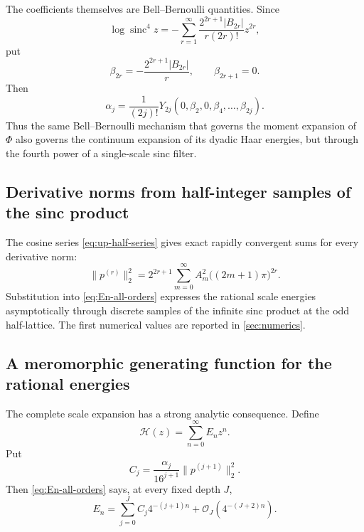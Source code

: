 \documentclass[11pt,oneside]{article}
\theoremstyle{definition}
\theoremstyle{remark}
\newcommand{\sinc}{\operatorname{sinc}}
\newcommand{\bigO}{\mathcal O}
\begin{document}
The coefficients themselves are Bell--Bernoulli quantities.  Since
\begin{equation}\label{eq:log-sinc4}
 \log\sinc^4z
 =-\sum_{r=1}^\infty
 \frac{2^{2r+1}|B_{2r}|}{r(2r)!}z^{2r},
\end{equation}
put
\begin{equation}\label{eq:beta-sinc4}
 \beta_{2r}=-\frac{2^{2r+1}|B_{2r}|}{r},
 \qquad \beta_{2r+1}=0.
\end{equation}
Then
\begin{equation}\label{eq:alpha-Bell}
 \alpha_j=\frac1{(2j)!}
 Y_{2j}(0,\beta_2,0,\beta_4,\ldots,\beta_{2j}).
\end{equation}
Thus the same Bell--Bernoulli mechanism that governs the moment expansion of
$\Phi$ also governs the continuum expansion of its dyadic Haar energies, but
through the fourth power of a single-scale sinc filter.

\subsection{Derivative norms from half-integer samples of the sinc product}

The cosine series \eqref{eq:up-half-series} gives exact rapidly convergent sums
for every derivative norm:
\begin{equation}\label{eq:p-derivative-norm-samples}
 \|p^{(r)}\|_2^2
 =2^{2r+1}\sum_{m=0}^\infty
 A_m^2\bigl((2m+1)\pi\bigr)^{2r}.
\end{equation}
Substitution into \eqref{eq:En-all-orders} expresses the rational scale energies
asymptotically through discrete samples of the infinite sinc product at the odd
half-lattice.  The first numerical values are reported in
\cref{sec:numerics}.


\subsection{A meromorphic generating function for the rational energies}

The complete scale expansion has a strong analytic consequence.  Define
\begin{equation}\label{eq:H-energy-generating}
 \mathcal H(z)=\sum_{n=0}^\infty E_nz^n.
\end{equation}
Put
\begin{equation}\label{eq:Cj-energy}
 C_j=\frac{\alpha_j}{16^{j+1}}\|p^{(j+1)}\|_2^2.
\end{equation}
Then \eqref{eq:En-all-orders} says, at every fixed depth $J$,
\begin{equation}\label{eq:En-geometric-expansion}
 E_n=\sum_{j=0}^{J}C_j4^{-(j+1)n}
      +\bigO_J\!\left(4^{-(J+2)n}\right).
\end{equation}
\end{document}

